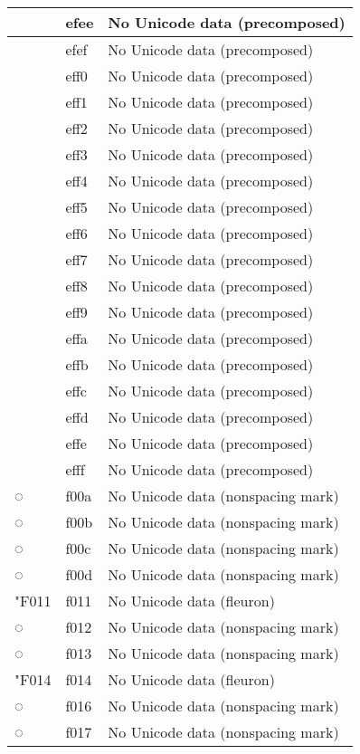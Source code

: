 \documentclass[12pt,letterpaper,openany]{book}
\begin{document}
\begin{center}
\begin{supertabular}{|m{0.25in}|m{0.5in}|m{4in}|}
			 & efee & No Unicode data (precomposed)\\\hline
			 & efef & No Unicode data (precomposed)\\\hline
			 & eff0 & No Unicode data (precomposed)\\\hline
			 & eff1 & No Unicode data (precomposed)\\\hline
			 & eff2 & No Unicode data (precomposed)\\\hline
			 & eff3 & No Unicode data (precomposed)\\\hline
			 & eff4 & No Unicode data (precomposed)\\\hline
			 & eff5 & No Unicode data (precomposed)\\\hline
			 & eff6 & No Unicode data (precomposed)\\\hline
			 & eff7 & No Unicode data (precomposed)\\\hline
			 & eff8 & No Unicode data (precomposed)\\\hline
			 & eff9 & No Unicode data (precomposed)\\\hline
			 & effa & No Unicode data (precomposed)\\\hline
			 & effb & No Unicode data (precomposed)\\\hline
			 & effc & No Unicode data (precomposed)\\\hline
			 & effd & No Unicode data (precomposed)\\\hline
			 & effe & No Unicode data (precomposed)\\\hline
			 & efff & No Unicode data (precomposed)\\\hline
			◌ & f00a & No Unicode data (nonspacing mark)\\\hline
			◌ & f00b & No Unicode data (nonspacing mark)\\\hline
			◌ & f00c & No Unicode data (nonspacing mark)\\\hline
			◌ & f00d & No Unicode data (nonspacing mark)\\\hline
			\char"F011 & f011 & No Unicode data (fleuron)\\\hline
			◌ & f012 & No Unicode data (nonspacing mark)\\\hline
			◌ & f013 & No Unicode data (nonspacing mark)\\\hline
			\char"F014 & f014 & No Unicode data (fleuron)\\\hline
			◌ & f016 & No Unicode data (nonspacing mark)\\\hline
			◌ & f017 & No Unicode data (nonspacing mark)\\\hline

\end{supertabular}
\end{center}
\end{document}
